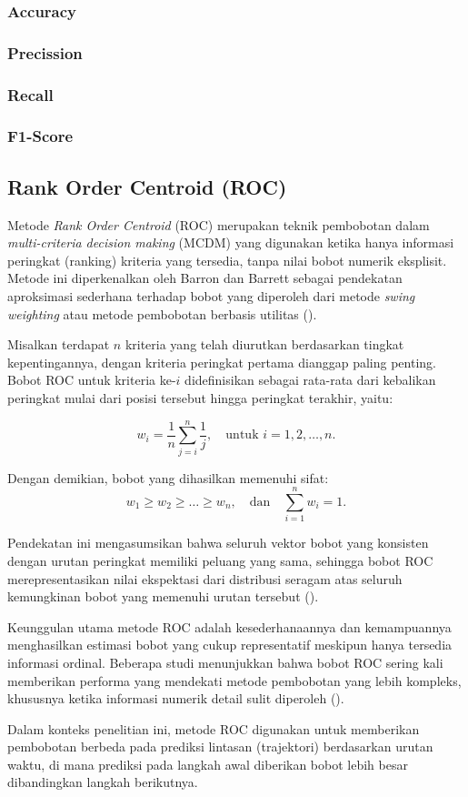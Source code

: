 \subsubsection{Accuracy}
\subsubsection{Precission}
\subsubsection{Recall}
\subsubsection{F1-Score}

\subsection{Rank Order Centroid (ROC)}\label{sec:ROC}

Metode \textit{Rank Order Centroid} (ROC) merupakan teknik pembobotan dalam
\textit{multi-criteria decision making} (MCDM) yang digunakan ketika hanya
informasi peringkat (ranking) kriteria yang tersedia, tanpa nilai bobot numerik
eksplisit. Metode ini diperkenalkan oleh Barron dan Barrett sebagai pendekatan
aproksimasi sederhana terhadap bobot yang diperoleh dari metode \textit{swing weighting}
atau metode pembobotan berbasis utilitas (\cite{barron1996decision}).

Misalkan terdapat $n$ kriteria yang telah diurutkan berdasarkan tingkat
kepentingannya, dengan kriteria peringkat pertama dianggap paling penting.
Bobot ROC untuk kriteria ke-$i$ didefinisikan sebagai rata-rata dari kebalikan
peringkat mulai dari posisi tersebut hingga peringkat terakhir, yaitu:

\begin{equation}
w_i = \frac{1}{n} \sum_{j=i}^{n} \frac{1}{j},
\quad \text{untuk } i = 1, 2, \dots, n.
\end{equation}

Dengan demikian, bobot yang dihasilkan memenuhi sifat:
\[
w_1 \ge w_2 \ge \dots \ge w_n,
\quad \text{dan} \quad
\sum_{i=1}^{n} w_i = 1.
\]

Pendekatan ini mengasumsikan bahwa seluruh vektor bobot yang konsisten
dengan urutan peringkat memiliki peluang yang sama, sehingga bobot ROC
merepresentasikan nilai ekspektasi dari distribusi seragam atas seluruh
kemungkinan bobot yang memenuhi urutan tersebut (\cite{barron1996decision}).

Keunggulan utama metode ROC adalah kesederhanaannya dan kemampuannya
menghasilkan estimasi bobot yang cukup representatif meskipun hanya tersedia
informasi ordinal. Beberapa studi menunjukkan bahwa bobot ROC sering kali
memberikan performa yang mendekati metode pembobotan yang lebih kompleks,
khususnya ketika informasi numerik detail sulit diperoleh (\cite{stillwell1981preference}).

Dalam konteks penelitian ini, metode ROC digunakan untuk memberikan
pembobotan berbeda pada prediksi lintasan (trajektori) berdasarkan urutan
waktu, di mana prediksi pada langkah awal diberikan bobot lebih besar
dibandingkan langkah berikutnya.